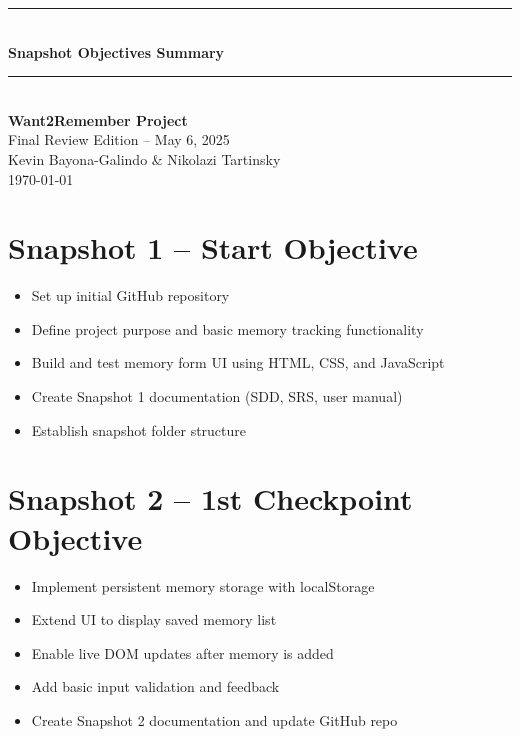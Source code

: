 \documentclass[12pt]{article}
\begin{document}
\begin{titlepage}
    \newcommand{\HRule}{\rule{\linewidth}{0.5mm}} 
    \vspace*{\fill}
    \begin{center}
        \HRule \\[0.5cm]
        {\Huge \bfseries Snapshot Objectives Summary \\[0.4cm]}
        \HRule \\[1.5cm]
        {\LARGE \textbf{Want2Remember Project}}\\[0.5cm]
        {\Large Final Review Edition – May 6, 2025}\\[2cm]
        {\Large Kevin Bayona-Galindo \& Nikolazi Tartinsky}\\[0.5cm]
        {\large \today}
    \end{center}
    \vspace*{\fill}
\end{titlepage}

\tableofcontents
\newpage

\section{Snapshot 1 – Start Objective}
\begin{itemize}
  \item Set up initial GitHub repository
  \item Define project purpose and basic memory tracking functionality
  \item Build and test memory form UI using HTML, CSS, and JavaScript
  \item Create Snapshot 1 documentation (SDD, SRS, user manual)
  \item Establish snapshot folder structure
\end{itemize}

\section{Snapshot 2 – 1st Checkpoint Objective}
\begin{itemize}
  \item Implement persistent memory storage with localStorage
  \item Extend UI to display saved memory list
  \item Enable live DOM updates after memory is added
  \item Add basic input validation and feedback
  \item Create Snapshot 2 documentation and update GitHub repo
\end{itemize}
\end{document}

